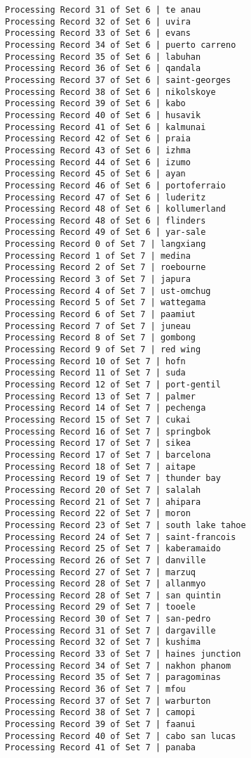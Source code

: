 \documentclass[11pt]{article}
\begin{document}
\begin{Verbatim}[commandchars=\\\{\}]
Processing Record 31 of Set 6 | te anau
Processing Record 32 of Set 6 | uvira
Processing Record 33 of Set 6 | evans
Processing Record 34 of Set 6 | puerto carreno
Processing Record 35 of Set 6 | labuhan
Processing Record 36 of Set 6 | qandala
Processing Record 37 of Set 6 | saint-georges
Processing Record 38 of Set 6 | nikolskoye
Processing Record 39 of Set 6 | kabo
Processing Record 40 of Set 6 | husavik
Processing Record 41 of Set 6 | kalmunai
Processing Record 42 of Set 6 | praia
Processing Record 43 of Set 6 | izhma
Processing Record 44 of Set 6 | izumo
Processing Record 45 of Set 6 | ayan
Processing Record 46 of Set 6 | portoferraio
Processing Record 47 of Set 6 | luderitz
Processing Record 48 of Set 6 | kollumerland
Processing Record 48 of Set 6 | flinders
Processing Record 49 of Set 6 | yar-sale
Processing Record 0 of Set 7 | langxiang
Processing Record 1 of Set 7 | medina
Processing Record 2 of Set 7 | roebourne
Processing Record 3 of Set 7 | japura
Processing Record 4 of Set 7 | ust-omchug
Processing Record 5 of Set 7 | wattegama
Processing Record 6 of Set 7 | paamiut
Processing Record 7 of Set 7 | juneau
Processing Record 8 of Set 7 | gombong
Processing Record 9 of Set 7 | red wing
Processing Record 10 of Set 7 | hofn
Processing Record 11 of Set 7 | suda
Processing Record 12 of Set 7 | port-gentil
Processing Record 13 of Set 7 | palmer
Processing Record 14 of Set 7 | pechenga
Processing Record 15 of Set 7 | cukai
Processing Record 16 of Set 7 | springbok
Processing Record 17 of Set 7 | sikea
Processing Record 17 of Set 7 | barcelona
Processing Record 18 of Set 7 | aitape
Processing Record 19 of Set 7 | thunder bay
Processing Record 20 of Set 7 | salalah
Processing Record 21 of Set 7 | ahipara
Processing Record 22 of Set 7 | moron
Processing Record 23 of Set 7 | south lake tahoe
Processing Record 24 of Set 7 | saint-francois
Processing Record 25 of Set 7 | kaberamaido
Processing Record 26 of Set 7 | danville
Processing Record 27 of Set 7 | marzuq
Processing Record 28 of Set 7 | allanmyo
Processing Record 28 of Set 7 | san quintin
Processing Record 29 of Set 7 | tooele
Processing Record 30 of Set 7 | san-pedro
Processing Record 31 of Set 7 | dargaville
Processing Record 32 of Set 7 | kushima
Processing Record 33 of Set 7 | haines junction
Processing Record 34 of Set 7 | nakhon phanom
Processing Record 35 of Set 7 | paragominas
Processing Record 36 of Set 7 | mfou
Processing Record 37 of Set 7 | warburton
Processing Record 38 of Set 7 | camopi
Processing Record 39 of Set 7 | faanui
Processing Record 40 of Set 7 | cabo san lucas
Processing Record 41 of Set 7 | panaba

\end{Verbatim}
\end{document}
